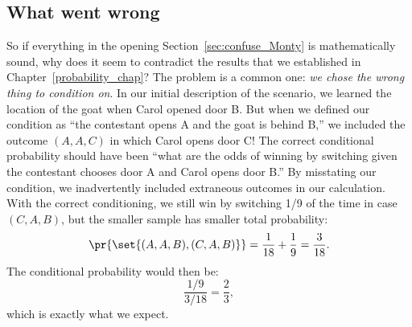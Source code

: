 \subsection{What went wrong}

So if everything in the opening Section~\ref{sec:confuse_Monty} is
mathematically sound, why does it seem to contradict the results that
we established in Chapter~\ref{probability_chap}?  The problem is a
common one: \emph{we chose the wrong thing to condition on}.  In our
initial description of the scenario, we learned the location of the
goat when Carol opened door B.  But when we defined our condition as
``the contestant opens A and the goat is behind B,'' we included the
outcome $(A, A, C)$ in which Carol opens door C!  The correct
conditional probability should have been ``what are the odds of
winning by switching given the contestant chooses door A and Carol
opens door B.''  By misstating our condition, we inadvertently
included extraneous outcomes in our calculation.  With the correct
conditioning, we still win by switching 1/9 of the time in case $(C,
A, B)$, but the smaller sample has smaller total probability:
\[
\pr{\set{(A, A, B),(C, A, B)}} = \frac{1}{18} + \frac{1}{9} = \frac{3}{18}.
\]
The conditional probability would then be:
\[
\frac{1/9}{3/18} = \frac{2}{3},
\]
which is exactly what we expect.

